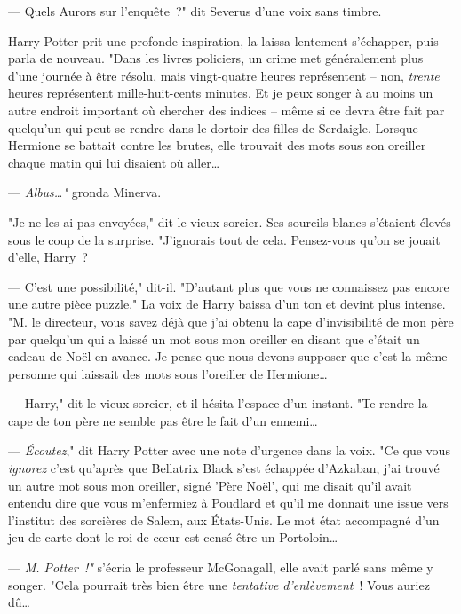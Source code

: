 --- Quels Aurors sur l'enquête~?" dit Severus d'une voix sans timbre.

Harry Potter prit une profonde inspiration, la laissa lentement s'échapper, puis parla de nouveau. "Dans les livres policiers, un crime met généralement plus d'une journée à être résolu, mais vingt-quatre heures représentent -- non, \emph{trente} heures représentent mille-huit-cents minutes. Et je peux songer à au moins un autre endroit important où chercher des indices -- même si ce devra être fait par quelqu'un qui peut se rendre dans le dortoir des filles de Serdaigle. Lorsque Hermione se battait contre les brutes, elle trouvait des mots sous son oreiller chaque matin qui lui disaient où aller…

--- \emph{Albus…"} gronda Minerva.

"Je ne les ai pas envoyées," dit le vieux sorcier. Ses sourcils blancs s'étaient élevés sous le coup de la surprise. "J'ignorais tout de cela. Pensez-vous qu'on se jouait d'elle, Harry~?

--- C'est une possibilité," dit-il. "D'autant plus que vous ne connaissez pas encore une autre pièce puzzle." La voix de Harry baissa d'un ton et devint plus intense. "M. le directeur, vous savez déjà que j'ai obtenu la cape d'invisibilité de mon père par quelqu'un qui a laissé un mot sous mon oreiller en disant que c'était un cadeau de Noël en avance. Je pense que nous devons supposer que c'est la même personne qui laissait des mots sous l'oreiller de Hermione…

--- Harry," dit le vieux sorcier, et il hésita l'espace d'un instant. "Te rendre la cape de ton père ne semble pas être le fait d'un ennemi…

--- \emph{Écoutez}," dit Harry Potter avec une note d'urgence dans la voix. "Ce que vous \emph{ignorez} c'est qu'après que Bellatrix Black s'est échappée d'Azkaban, j'ai trouvé un autre mot sous mon oreiller, signé 'Père Noël', qui me disait qu'il avait entendu dire que vous m'enfermiez à Poudlard et qu'il me donnait une issue vers l'institut des sorcières de Salem, aux États-Unis. Le mot état accompagné d'un jeu de carte dont le roi de cœur est censé être un Portoloin…

--- \emph{M. Potter~!"} s'écria le professeur McGonagall, elle avait parlé sans même y songer. "Cela pourrait très bien être une \emph{tentative d'enlèvement}~! Vous auriez dû…

